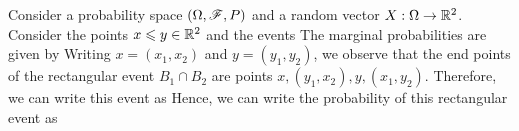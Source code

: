 \documentclass[letterpaper,10pt,english]{article}
\begin{document}
\begin{shaded}
\begin{exmp} 
Consider a probability space $(\Omega, \mathscr{F}, P)$ and a random vector $X: \Omega \to \mathbb{R}^2$. 
Consider the points $x \leqslant y\in \mathbb{R}^2$ and the events 
The marginal probabilities are given by
Writing $x = (x_1,x_2)$ and $y = (y_1,y_2)$, 
we observe that the end points of the rectangular event $B_1\cap B_2$ are points $x, (y_1,x_2), y, (x_1, y_2)$. 
Therefore, we can write this event as 
Hence, we can write the probability of this rectangular event as 
\end{exmp}
\end{shaded}
\end{document}
